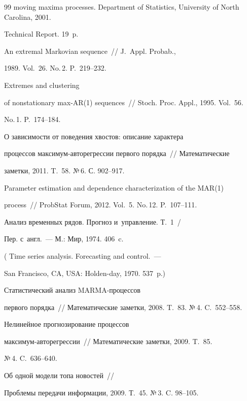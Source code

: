 {{\begin{thebibliography}{99}
moving maxima processes.  Department of Statistics, University of North Carolina, 2001. 


Technical Report. 19~p.




 An extremal Markovian sequence~/\!\!/ J.~Appl. Probab.,


1989. Vol.~26. No.\,2. P.~219--232.




 Extremes and clustering


of nonstationary max-AR(1) sequences~/\!\!/ Stoch. Proc. Appl., 1995. Vol.~56.


No.\,1. P.~174--184.




 О зависимости от поведения хвостов: описание характера


процессов мак\-си\-мум-ав\-то\-ре\-грес\-сии первого порядка~/\!\@/ Математические


заметки, 2011. T.~58. №\,6. С. 902--917.




 Parameter estimation and dependence characterization of the MAR(1) 


process~/\!\!/ ProbStat Forum, 2012. Vol.~5. No.\,12. P.~107--111.




 Анализ временных рядов. Прогноз и~управление. Т.~1~/ 


Пер. с~англ.~--- М.: Мир, 1974. 406~c.


( Time series analysis. Forecasting and control.~--- 


San Francisco, CA, USA: Holden-day, 1970. 537~p.)




 Статистический анализ MARMA-про\-цес\-сов


первого порядка~/\!\!/ Математические заметки, 2008. T.~83. №\,4. C.~552--558.




 Нелинейное прогнозирование процессов


мак\-си\-мум-ав\-то\-ре\-грес\-сии~/\!\!/ Математические заметки, 2009. T.~85. 


№\,4. C.~636--640.




 Об одной модели топа новостей~/\!\!/


Проб\-лемы передачи информации, 2009. Т.~45. №\,3. C. 98--105.


       \end{thebibliography}


} }








